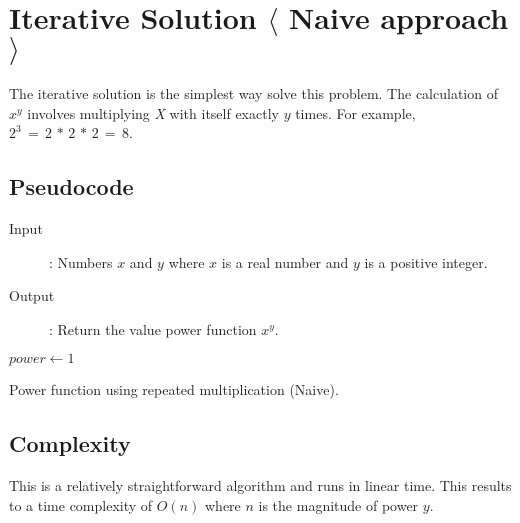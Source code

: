 \documentclass[11pt,a4paper]{report}
\theoremstyle{definition}
\theoremstyle{remark}
\begin{document}
            \section{Iterative Solution $\langle$ Naive approach $\rangle$} %
        	The iterative solution is the simplest way solve this problem. The calculation of $x^y$ involves multiplying \emph{X} with itself exactly $y$ times.
        	For example, $2^3 \, = \, 2 \, * \, 2 \, * \, 2 \, = \, 8$.
        	
        	\subsection{Pseudocode}
        	
            	\begin{description}
                	\item [Input]: Numbers $x$ and $y$ where $x$ is a real number and $y$ is a positive integer.
                	\item [Output]: Return the value power function $x^y$.
            	\end{description}
            	
            	\begin{algorithm}
                	    $power \gets 1$\;
                	    \;
                \caption{Power function using repeated multiplication (Naive).}
                \label{alg:power-incremental}
            	\end{algorithm}
            	
            \subsection{Complexity}
            This is a relatively straightforward algorithm and runs in linear time. This results to a time complexity of $O(n)$ where $n$ is the magnitude of power $y$.
        
\end{document}
